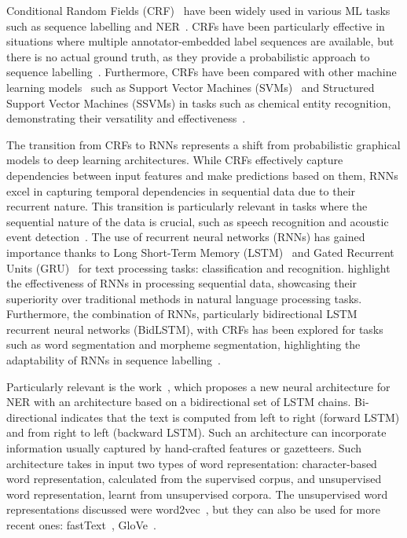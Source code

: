 Conditional Random Fields (CRF)~\cite{lafferty2001conditional} have been widely used in various ML tasks such as sequence labelling and NER~\cite{rodriguez2013sequence}. 
CRFs have been particularly effective in situations where multiple annotator-embedded label sequences are available, but there is no actual ground truth, as they provide a probabilistic approach to sequence labelling~\cite{rodriguez2013sequence}. 
Furthermore, CRFs have been compared with other machine learning models~\cite{tang2015aComparison} such as Support Vector Machines (SVMs)~\cite{boser1992training} and Structured Support Vector Machines (SSVMs) in tasks such as chemical entity recognition, demonstrating their versatility and effectiveness~\cite{tang2015aComparison, naseem2021aComparative, yang2019madex}.


The transition from CRFs to RNNs represents a shift from probabilistic graphical models to deep learning architectures. 
While CRFs effectively capture dependencies between input features and make predictions based on them, RNNs excel in capturing temporal dependencies in sequential data due to their recurrent nature. 
This transition is particularly relevant in tasks where the sequential nature of the data is crucial, such as speech recognition and acoustic event detection~\cite{graves2013speech,tian2020artificial}.
The use of recurrent neural networks (RNNs) has gained importance thanks to Long Short-Term Memory (LSTM)~\cite{sak2014long} and Gated Recurrent Units (GRU)~\cite{cho2001learning} for text processing tasks: classification and recognition. 
\cite{kim2022research, lyu2020combine,li2022channel, siswantining2023spratama} highlight the effectiveness of RNNs in processing sequential data, showcasing their superiority over traditional methods in natural language processing tasks.
Furthermore, the combination of RNNs, particularly bidirectional LSTM recurrent neural networks (BidLSTM), with CRFs has been explored for tasks such as word segmentation and morpheme segmentation, highlighting the adaptability of RNNs in sequence labelling~\cite{huang2015bidirectional}.

Particularly relevant is the work~\cite{lample2016neural}, which proposes a new neural architecture for NER with an architecture based on a bidirectional set of LSTM chains. 
Bi-directional indicates that the text is computed from left to right (forward LSTM) and from right to left (backward LSTM). 
Such an architecture can incorporate information usually captured by hand-crafted features or gazetteers. 
Such architecture takes in input two types of word representation: character-based word representation, calculated from the supervised corpus, and unsupervised word representation, learnt from unsupervised corpora. 
The unsupervised word representations discussed were word2vec~\cite{mikolov2013efficient}, but they can also be used for more recent ones: fastText~\cite{joulin2016fasttext}, GloVe~\cite{pennington2014glove}.

